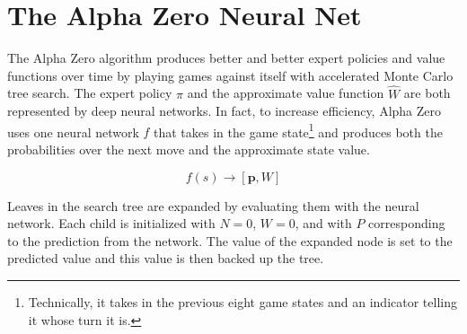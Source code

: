 \documentclass[10pt]{article}
\newcommand{\vect}[1]{\boldsymbol{\mathbf{#1}}}
\begin{document}
\section*{The Alpha Zero Neural Net}

The Alpha Zero algorithm produces better and better expert policies and value functions over time by playing games against itself with accelerated Monte Carlo tree search.
The expert policy $\pi$ and the approximate value function $\hat{W}$ are both represented by deep neural networks.
In fact, to increase efficiency, Alpha Zero uses one neural network $f$ that takes in the game state\footnote{Technically, it takes in the previous eight game states and an indicator telling it whose turn it is.} and produces both the probabilities over the next move and the approximate state value.

\[f(s) \rightarrow [\vect p, W]\]

Leaves in the search tree are expanded by evaluating them with the neural network.
Each child is initialized with $N = 0$, $W = 0$, and with $P$ corresponding to the prediction from the network.
The value of the expanded node is set to the predicted value and this value is then backed up the tree.
\end{document}
